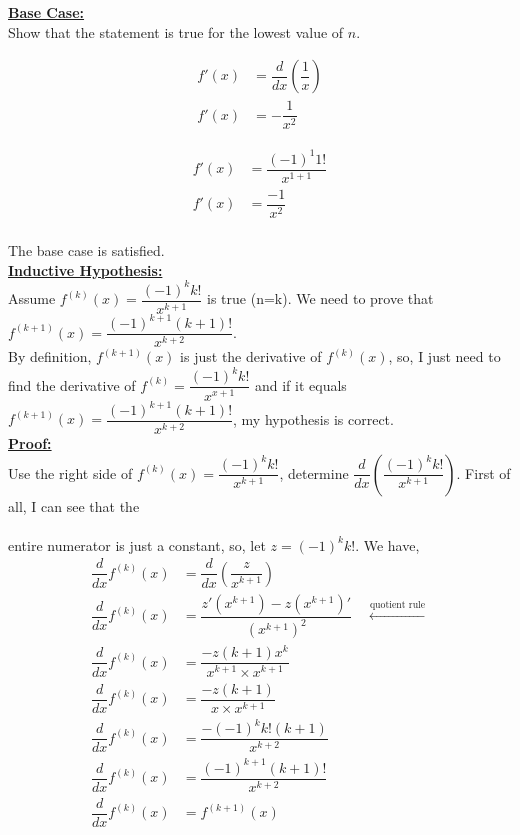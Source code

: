 \documentclass[12pt]{book}
\begin{document}
\begin{enumerate}
\textbf{\underline{Base Case:}}\\
Show that the statement is true for the lowest value of $n$.\\
\begin{minipage}{0.5\textwidth}
    \begin{align*}
        f'(x) &= \dfrac{d}{dx} \left(\dfrac{1}{x}\right) \\
        f'(x) &= -\dfrac{1}{x^2}
    \end{align*}
\end{minipage}
\begin{minipage}{0.5\textwidth}
    \begin{align*}
        f'(x) &= \dfrac{(-1)^1 1!}{x^{1+1}} \\
        f'(x) &= \dfrac{-1}{x^2} \\
    \end{align*}
\end{minipage}
The base case is satisfied.\\

\textbf{\underline{Inductive Hypothesis:}}\\
Assume $f^{(k)}(x) = \dfrac{(-1)^k k!}{x^{k+1}}$ is true (n=k). We need to prove that $f^{(k+1)}(x) = \dfrac{(-1)^{k+1} (k+1)!}{x^{k+2}}$.\\

By definition, $f^{(k+1)}(x)$ is just the derivative of $f^{(k)}(x)$, so,  I just need to find the derivative of $f^{(k)} = \dfrac{(-1)^k k!}{x^{x+1}}$ and if it equals $f^{(k+1)}(x) = \dfrac{(-1)^{k+1} (k+1)!}{x^{k+2}}$, my hypothesis is correct.\\

\textbf{\underline{Proof:}}\\
Use the right side of $f^{(k)}(x) = \dfrac{(-1)^k k!}{x^{k+1}}$, determine $\dfrac{d}{dx} \left(\dfrac{(-1)^kk!}{x^{k+1}}\right)$. First of all, I can see that the\\\\ entire numerator is just a constant, so, let $z = (-1)^kk!$. We have,
\begingroup
\addtolength{\jot}{0.5em}
\begin{align}
    \dfrac{d}{dx} f^{(k)}(x) &= \dfrac{d}{dx} \left(\dfrac{z}{x^{k+1}}\right) \\
    \dfrac{d}{dx} f^{(k)}(x) &= \dfrac{z' (x^{k+1}) - z(x^{k+1})'}{ \left(x^{k+1}\right)^2 } \quad \xleftarrow[]{\text{quotient rule}} \\
    \dfrac{d}{dx} f^{(k)}(x) &= \dfrac{- z(k+1)x^{k}}{ x^{k+1} \times x^{k+1} } \\
    \dfrac{d}{dx} f^{(k)}(x) &= \dfrac{- z(k+1)}{ x \times x^{k+1} } \\
    \dfrac{d}{dx} f^{(k)}(x) &= \dfrac{- (-1)^k k!  (k+1)}{ x^{k+2} } \\
    \dfrac{d}{dx} f^{(k)}(x) &= \dfrac{(-1)^{k+1} (k+1)! }{ x^{k+2} } \\
    \dfrac{d}{dx} f^{(k)}(x) &= f^{(k+1)}(x)
\end{align}
\endgroup


\end{enumerate}
\end{document}
